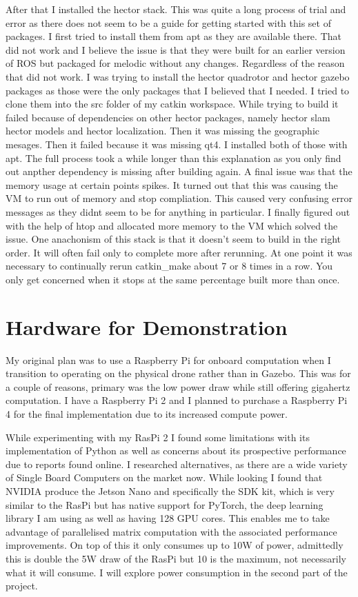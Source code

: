 \documentclass[]{../resources/final_report}
\begin{document}
After that I installed the hector stack. This was quite a long process of trial and error as there 
does not seem to be a guide for getting started with this set of packages. I first tried to install 
them from apt as they are available there. That did not work and I believe the issue is that they 
were built for an earlier version of ROS but packaged for melodic without any changes. Regardless 
of the reason that did not work. I was trying to install the hector quadrotor and hector gazebo 
packages as those were the only packages that I believed that I needed. I tried to clone them into 
the src folder of my catkin workspace. While trying to build it failed because of dependencies on 
other hector packages, namely hector slam hector models and hector localization. Then it was missing 
the geographic mesages. Then it failed because it was missing qt4. I installed both of those with 
apt. The full process took a while longer than this explanation as you only find out anpther 
dependency is missing after building again. A final issue was that the memory usage at certain 
points spikes. It turned out that this was causing the VM to run out of memory and stop compliation. 
This caused very confusing error messages as they didnt seem to be for anything in particular. I 
finally figured out with the help of htop and allocated more memory to the VM which solved the issue. 
One anachonism of this stack is that it doesn't seem to build in the right order. It will often fail 
only to complete more after rerunning. At one point it was necessary to continually rerun catkin\_make 
about 7 or 8 times in a row. You only get concerned when it stops at the same percentage built more 
than once. 


\section{Hardware for Demonstration}

My original plan was to use a Raspberry Pi for onboard computation when I transition to 
operating on the physical drone rather than in Gazebo. This was for a couple of reasons, primary was 
the low power draw while still offering gigahertz computation. I have a Raspberry Pi 2 and I planned 
to purchase a Raspberry Pi 4 for the final implementation due to its increased compute power.

While experimenting with my RasPi 2 I found some limitations with its implementation of Python as 
well as concerns about its prospective performance due to reports found online. I researched 
alternatives, as there are a wide variety of Single Board Computers on the market now. While looking 
I found that NVIDIA produce the Jetson Nano and specifically the SDK kit, which is very similar to 
the RasPi but has native support for PyTorch, the deep learning library I am using as well as having 
128 GPU cores. This enables me to take advantage of parallelised matrix computation with the 
associated performance improvements. On top of this it only consumes up to 10W of power, admittedly 
this is double the 5W draw of the RasPi but 10 is the maximum, not necessarily what it will consume. 
I will explore power consumption in the second part of the project.
\end{document}
